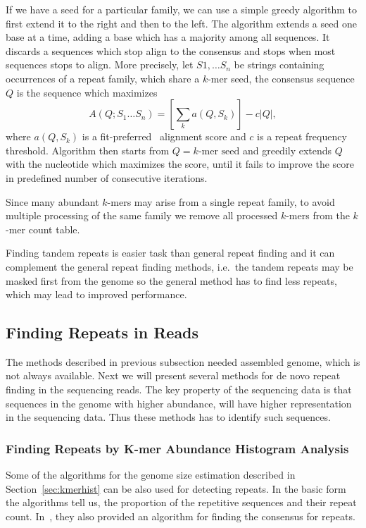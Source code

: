If we have a seed for a particular family, we can use a simple greedy algorithm to first extend it to the right and then to the left. The algorithm extends a seed one base at a time, adding a base which has a majority among all sequences. It discards a sequences which stop align to the consensus and stops when most sequences stops to align. More precisely, let $S1,\dots S_n$ be strings containing occurrences of a repeat family, which share a $k$-mer seed, the consensus sequence $Q$ is the sequence which maximizes
$$A(Q; S_1 \dots S_n) = \left[\sum_k a(Q, S_k)\right] - c |Q|,$$
where $a(Q, S_k)$ is a fit-preferred~\cite{repscout} alignment score and $c$ is a repeat frequency threshold.
Algorithm then starts from $Q = \text{$k$-mer seed}$ and greedily extends $Q$ with the nucleotide which maximizes the score, until it fails to improve the score in predefined number of consecutive iterations.

Since many abundant $k$-mers may arise from a single repeat family, to avoid multiple processing of the same family we remove all processed $k$-mers from the $k$-mer count table.

Finding tandem repeats is easier task than general repeat finding and it can complement the general repeat finding methods, i.e.\ the tandem repeats may be masked first from the genome so the general method has to find less repeats, which may lead to improved performance.

\subsection{Finding Repeats in Reads}\label{sect:repeats-reads}

The methods described in previous subsection needed assembled genome, which is not always available. Next we will present several methods for de novo repeat finding in the sequencing reads. The key property of the sequencing data is that sequences in the genome with higher abundance, will have higher representation in the sequencing data. Thus these methods has to identify such sequences.

\subsubsection{Finding Repeats by K-mer Abundance Histogram Analysis}

Some of the algorithms for the genome size estimation described in Section~\ref{sec:kmerhist} can be also used for detecting repeats.
In the basic form the algorithms tell us, the proportion of the repetitive sequences and their repeat count. In~\cite{waterman}, they also provided an algorithm for finding the consensus for repeats.


